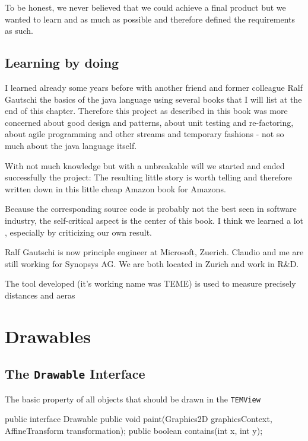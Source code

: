 \documentclass[a4paper]{book}
\begin{document}
To be honest, we never believed that we could achieve a final product but we wanted to learn and as much as possible and therefore defined the requirements as such. 

\section{Learning by doing}

I learned already some years before with another friend and former colleague Ralf Gautschi the basics of the java language using several books that I will list at the end of this chapter. Therefore this project as described in this book was more concerned about good design and patterns, about unit testing and re-factoring, about agile programming and other streams and temporary fashions - not so much about the java language itself. 

With not much knowledge but with a unbreakable will we started and ended successfully the project: 
The resulting little story is worth telling and therefore written down in this little cheap Amazon book for Amazons.

Because the corresponding source code is probably not the best seen in software 
industry,  the self-critical aspect is the center of this book. I think we learned a lot
, especially by criticizing our own result.

Ralf Gautschi is now principle engineer at Microsoft, Zuerich. Claudio and me are still working for Synopsys AG. We are both located in Zurich and work in R\&D. 
   
   
The tool developed (it's working name was TEME) is used to measure precisely distances and aeras   
   
\chapter{Drawables}

\section{The \texttt{Drawable} Interface}

The basic property of all objects that should be drawn in the \texttt{TEMView} 


\begin{JAVA} [label=Drawable,caption=The Drawable Interface all \texttt{Drawables} are implemented against]
public interface Drawable  {	
	public void paint(Graphics2D graphicsContext, AffineTransform transformation); 		
	public boolean contains(int x, int y);	
}
\end{JAVA}
\end{document}
